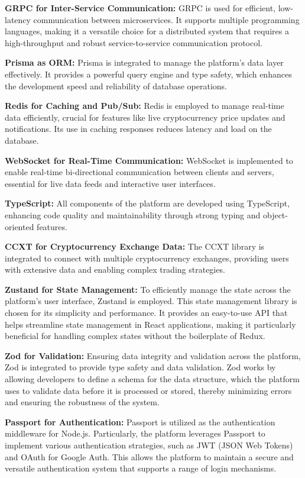 \documentclass[12pt]{report}
\begin{document}
\textbf{GRPC for Inter-Service Communication:} GRPC is used for efficient, low-latency communication between microservices. It supports multiple programming languages, making it a versatile choice for a distributed system that requires a high-throughput and robust service-to-service communication protocol.

\textbf{Prisma as ORM:} Prisma is integrated to manage the platform’s data layer effectively. It provides a powerful query engine and type safety, which enhances the development speed and reliability of database operations.

\textbf{Redis for Caching and Pub/Sub:} Redis is employed to manage real-time data efficiently, crucial for features like live cryptocurrency price updates and notifications. Its use in caching responses reduces latency and load on the database.

\textbf{WebSocket for Real-Time Communication:} WebSocket is implemented to enable real-time bi-directional communication between clients and servers, essential for live data feeds and interactive user interfaces.

\textbf{TypeScript:} All components of the platform are developed using TypeScript, enhancing code quality and maintainability through strong typing and object-oriented features.

\textbf{CCXT for Cryptocurrency Exchange Data:} The CCXT library is integrated to connect with multiple cryptocurrency exchanges, providing users with extensive data and enabling complex trading strategies.

\textbf{Zustand for State Management:} To efficiently manage the state across the platform's user interface, Zustand is employed. This state management library is chosen for its simplicity and performance. It provides an easy-to-use API that helps streamline state management in React applications, making it particularly beneficial for handling complex states without the boilerplate of Redux.

\textbf{Zod for Validation:} Ensuring data integrity and validation across the platform, Zod is integrated to provide type safety and data validation. Zod works by allowing developers to define a schema for the data structure, which the platform uses to validate data before it is processed or stored, thereby minimizing errors and ensuring the robustness of the system.

\textbf{Passport for Authentication:} Passport is utilized as the authentication middleware for Node.js. Particularly, the platform leverages Passport to implement various authentication strategies, such as JWT (JSON Web Tokens) and OAuth for Google Auth. This allows the platform to maintain a secure and versatile authentication system that supports a range of login mechanisms.
\end{document}
